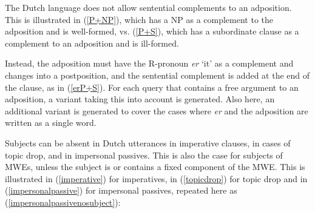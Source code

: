 \documentclass[output=paper,colorlinks,citecolor=brown]{langscibook}
\begin{document}
 The Dutch language does not allow sentential complements to  an adposition. This is illustrated in (\ref{P+NP}), which has a NP as a complement to the adposition and is well-formed, vs. (\ref{P+S}), which has a subordinate clause as a complement to an adposition and is ill-formed. 

\begin{exe}
\ex
\begin{xlist}


\end{xlist}
\end{exe}

Instead, the adposition must have the R-pronoun \textit{er} `it' as a complement and changes into a postposition, and the sentential complement is added at the end of the clause, as in (\ref{erP+S}). For each query that contains a free argument to an adposition, a variant taking this into account is generated. Also here, an additional variant is generated to cover the cases where \textit{er} and the adposition are written as a single word.
  
 Subjects can be absent in Dutch utterances in imperative clauses, in cases of topic drop, and in impersonal passives. This is also the case for subjects of MWEs, unless the subject is or contains a fixed component of the MWE. This is illustrated in (\ref{imperative}) for imperatives, in (\ref{topicdrop}) for topic drop and in (\ref{impersonalpassive}) for impersonal passives, repeated here as (\ref{impersonalpassivenosubject}):
\end{document}
